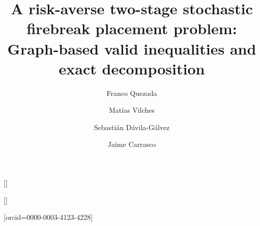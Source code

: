 \documentclass[a4paper,fleqn]{cas-sc}
\begin{document}
\let\WriteBookmarks\relax
\def\floatpagepagefraction{1}
\def\textpagefraction{.001}

\title [mode = title]{A risk-averse two-stage stochastic firebreak placement problem: Graph-based valid inequalities and exact decomposition} 


\author[2,4]{Franco Quezada}[]\cormark[1]

\author[2]{Mat\'ias Vilches}[]

\author[2,4]{Sebasti\'an D\'avila-G\'alvez}

\author[1,5]{Jaime Carrasco}[orcid=0000-0003-4123-4228]








\address[1]{Departamento de Industria, Facultad de Ingenier\'ia, Universidad Tecnol\'ogica Metropolitana, Santiago, Chile}

\address[2]{Industrial Engineering Department, Faculty of Engineering, University of Santiago of Chile, Santiago, Chile}

\address[3]{Industrial Engineering Department, University of Chile, Santiago, Chile}

\address[4]{Program for the Development of Sustainable Production Systems, Faculty of Engineering, University of Santiago of Chile, Santiago, Chile}

\address[5]{Complex Engineering System Institute - ISCI, Santiago, Chile}

\end{document}
